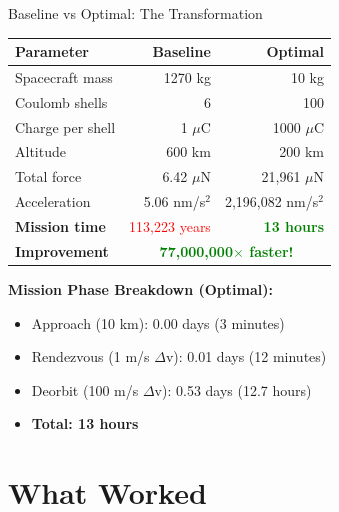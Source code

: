 \documentclass[11pt]{beamer}
\begin{document}
\begin{frame}{Baseline vs Optimal: The Transformation}

\begin{table}[h]
\centering
\begin{tabular}{lrr}
\toprule
\textbf{Parameter} & \textbf{Baseline} & \textbf{Optimal} \\
\midrule
Spacecraft mass & 1270 kg & 10 kg \\
Coulomb shells & 6 & 100 \\
Charge per shell & 1 $\mu$C & 1000 $\mu$C \\
Altitude & 600 km & 200 km \\
\midrule
Total force & 6.42 $\mu$N & 21,961 $\mu$N \\
Acceleration & 5.06 nm/s$^2$ & 2,196,082 nm/s$^2$ \\
\midrule
\textbf{Mission time} & \textcolor{red}{113,223 years} & \textcolor{green}{\textbf{13 hours}} \\
\midrule
\textbf{Improvement} & \multicolumn{2}{c}{\textcolor{green}{\textbf{77,000,000$\times$ faster!}}} \\
\bottomrule
\end{tabular}
\end{table}

\vspace{0.3cm}

\textbf{Mission Phase Breakdown (Optimal):}
\begin{itemize}
\item Approach (10 km): 0.00 days (3 minutes)
\item Rendezvous (1 m/s $\Delta$v): 0.01 days (12 minutes)
\item Deorbit (100 m/s $\Delta$v): 0.53 days (12.7 hours)
\item \textbf{Total: 13 hours} \checkmark
\end{itemize}

\end{frame}

\section{What Worked}
\end{document}
